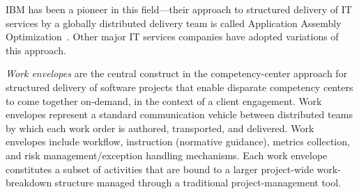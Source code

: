 IBM has been a pioneer in
this field---their approach to structured delivery of IT services by a globally
distributed delivery team is called Application Assembly
Optimization~\cite{gloaao}. Other major IT services companies have adopted
variations of this approach.

\textit{Work envelopes} are the central construct in the competency-center approach for
structured delivery of software projects that enable disparate competency
centers to come together on-demand, in the context of a client engagement.  Work
envelopes represent a standard communication vehicle between distributed teams
by which each work order is authored, transported, and delivered. Work envelopes
include workflow, instruction (normative guidance), metrics collection, and risk
management/exception handling mechanisms. Each work envelope constitutes a
subset of activities that are bound to a larger project-wide work-breakdown
structure managed through a traditional project-management tool. 



